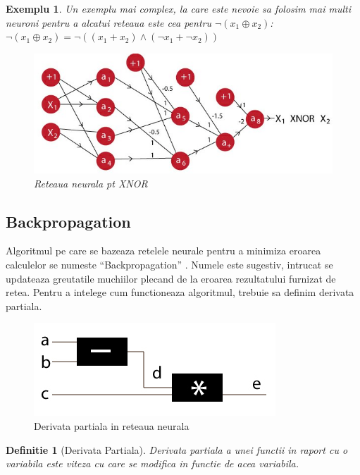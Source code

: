 \documentclass{article}
\newtheorem{definition}{Definitie}[section]
\newtheorem{example}{Exemplu}[section]
\begin{document}
\begin{example}
Un exemplu mai complex, la care este nevoie sa folosim mai multi neuroni pentru a alcatui reteaua este cea pentru $\neg (x_1 \oplus x_2)$:\\
$\neg (x_1 \oplus x_2) = \neg((x_1+x_2) \land (\neg x_1 + \neg x_2))$

\begin{figure}[H]
	\includegraphics[scale=0.5]{xnor_s}
	\caption{Reteaua neurala pt XNOR \cite{Deep_Learning}}
\end{figure}

\end{example}

\subsection{Backpropagation}
Algoritmul pe care se bazeaza retelele neurale pentru a minimiza eroarea calculelor se numeste ``Backpropagation'' \cite{Deep_Learning}. Numele este sugestiv, intrucat se updateaza greutatile muchiilor plecand de la eroarea rezultatului furnizat de retea. Pentru a intelege cum functioneaza algoritmul, trebuie sa definim derivata partiala.

\begin{figure}[H]
	\includegraphics[scale=0.5]{gradient_diagram}
	\caption{Derivata partiala in reteaua neurala \cite{Deep_Learning}}
\end{figure}

\begin{definition}[Derivata Partiala]
Derivata partiala a unei functii in raport cu o variabila este viteza cu care se modifica in functie de acea variabila. \cite{Deep_Learning}\\
\end{definition}
\end{document}
